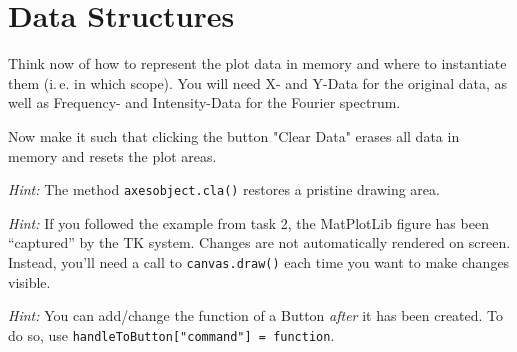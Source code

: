 \documentclass[
	english,
	fontsize=10pt,
	parskip=half,
	titlepage=true,
	DIV=12
]{scrartcl}
\newcommand*{\ie}{i.\,e.\xspace}
\begin{document}
\section{Data Structures}
Think now of how to represent the plot data in memory and where to instantiate them (\ie in which scope). You will need X- and Y-Data for the original data, as well as Frequency- and Intensity-Data for the Fourier spectrum.

Now make it such that clicking the button "Clear Data" erases all data in memory and resets the plot areas.

\emph{Hint:} The method \texttt{axesobject.cla()} restores a pristine drawing area.

\emph{Hint:} If you followed the example from task 2, the MatPlotLib figure has been \enquote{captured} by the TK system. Changes are not automatically rendered on screen. Instead, you'll need a call to \texttt{canvas.draw()} each time you want to make changes visible.

\emph{Hint:} You can add/change the function of a Button \emph{after} it has been created. To do so, use \texttt{handleToButton["command"] = function}.
\end{document}
